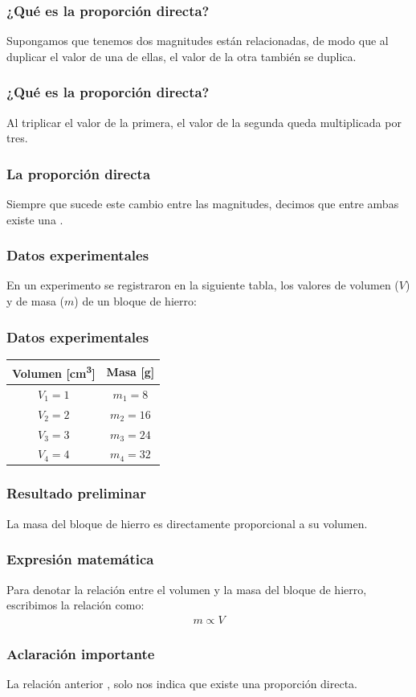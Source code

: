 \documentclass[14pt]{beamer}
\begin{document}
\begin{frame}
\frametitle{¿Qué es la proporción directa?}
Supongamos que tenemos dos magnitudes están relacionadas, \pause de modo que al duplicar el valor de una de ellas, \pause el valor de la otra también se duplica.
\end{frame}
\begin{frame}
\frametitle{¿Qué es la proporción directa?}
Al triplicar el valor de la primera, \pause el valor de la segunda queda multiplicada por tres.
\end{frame}
\begin{frame}
\frametitle{La proporción directa}
Siempre que sucede este cambio entre las magnitudes, decimos que entre ambas existe una .
\end{frame}
\begin{frame}
\frametitle{Datos experimentales}
En un experimento se registraron en la siguiente tabla, los valores de volumen ($V$) y de masa ($m$) de un bloque de hierro:
\end{frame}
\begin{frame}
\frametitle{Datos experimentales}
\begin{table}
    \renewcommand{\arraystretch}{1}
    \centering
    \begin{tabular}{c | c}
    Volumen [\unit{\cubic\centi\meter}] & Masa [\unit{\gram}] \\ \hline
    $V_{1} = 1$ & $m_{1} = 8$ \\ \hline
    $V_{2} = 2$ & $m_{2} = 16$ \\ \hline
    $V_{3} = 3$ & $m_{3} = 24$ \\ \hline
    $V_{4} = 4$ & $m_{4} = 32$ \\ \hline
    \end{tabular}
\end{table}
\end{frame}
\begin{frame}
\frametitle{Resultado preliminar}
La masa del bloque de hierro es directamente proporcional a su volumen.
\end{frame}
\begin{frame}
\frametitle{Expresión matemática}
Para denotar la relación entre el volumen y la masa del bloque de hierro, escribimos la relación como:
\pause
\begin{align*}
m \propto V
\end{align*}
\end{frame}
\begin{frame}
\frametitle{Aclaración importante}
La relación anterior , solo nos indica que existe una proporción directa.
\end{frame}
\end{document}
